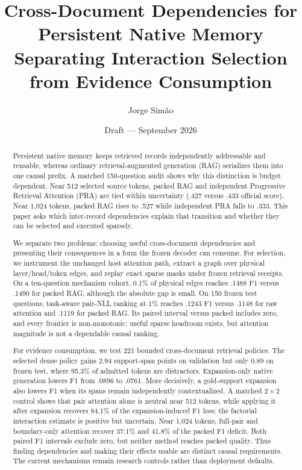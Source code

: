 \documentclass[11pt]{article}
\title{Cross-Document Dependencies for Persistent Native Memory\\
\large Separating Interaction Selection from Evidence Consumption}
\author{Jorge Sim\~ao}
\date{Draft --- September 2026}
\begin{document}
\maketitle

\begin{abstract}
Persistent native memory keeps retrieved records independently addressable and
reusable, whereas ordinary retrieval-augmented generation (RAG) serializes them
into one causal prefix. A matched 150-question audit shows why this distinction
is budget dependent. Near 512 selected source tokens, packed RAG and independent
Progressive Retrieval Attention (PRA) are tied within uncertainty (.427 versus
.433 official score). Near 1,024 tokens, packed RAG rises to .527 while
independent PRA falls to .333. This paper asks which inter-record dependencies
explain that transition and whether they can be selected and executed sparsely.

We separate two problems: choosing useful cross-document dependencies and
presenting their consequences in a form the frozen decoder can consume. For
selection, we instrument the unchanged host attention path, extract a graph over
physical layer/head/token edges, and replay exact sparse masks under frozen
retrieval receipts. On a ten-question mechanism cohort, 0.1\% of physical edges
reaches .1488 F1 versus .1490 for packed RAG, although the absolute gap is small.
On 150 frozen test questions, task-aware pair-NLL ranking at 1\% reaches .1243
F1 versus .1148 for raw attention and .1119 for packed RAG. Its paired interval
versus packed includes zero, and every frontier is non-monotonic: useful sparse
headroom exists, but attention magnitude is not a dependable causal ranking.

For evidence consumption, we test 221 bounded cross-document retrieval policies.
The selected dense policy gains 2.94 support-span points on validation but only
0.89 on frozen test, where 95.3\% of admitted tokens are distractors.
Expansion-only native generation lowers F1 from .0896 to .0761. More decisively,
a gold-support expansion also lowers F1 when its spans remain independently
contextualized. A matched $2\times2$ control shows that pair attention alone is
neutral near 512 tokens, while applying it after expansion recovers 84.1\% of
the expansion-induced F1 loss; the factorial interaction estimate is positive
but uncertain. Near 1,024 tokens, full-pair and boundary-only attention recover
37.1\% and 41.8\% of the packed F1 deficit. Both paired F1 intervals exclude
zero, but neither method reaches packed quality. Thus finding dependencies and
making their effects usable are distinct causal requirements. The current
mechanisms remain research controls rather than deployment defaults.
\end{abstract}
\end{document}
